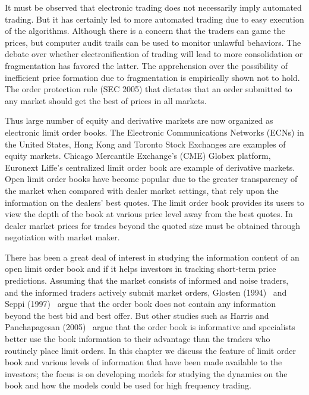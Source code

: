 It must be observed that electronic trading does not necessarily imply automated trading. But it has certainly led to more automated trading due to easy execution of the algorithms. Although there is a concern that the traders can game the prices, but computer audit trails can be used to monitor unlawful behaviors. The debate over whether electronification of trading will lead to more consolidation or fragmentation has favored the latter. The apprehension over the possibility of inefficient price formation due to fragmentation is empirically shown not to hold. The order protection rule (SEC 2005) that dictates that an order submitted to any market should get the best of prices in all markets. 


Thus large number of equity and derivative markets are now organized as electronic limit order books. The Electronic Communications Networks (ECNs) in the United States, Hong Kong and Toronto Stock Exchanges are examples of equity markets. Chicago Mercantile Exchange's (CME) Globex platform, Euronext Liffe's centralized limit order book are example of derivative markets. Open limit order books have become popular due to the greater transparency of the market when compared with dealer market settings, that rely upon the information on the dealers' best quotes. The limit order book provides its users to view the depth of the book at various price level away from the best quotes. In dealer market prices for trades beyond the quoted size must be obtained through negotiation with market maker. 


There has been a great deal of interest in studying the information content of an open limit order book and if it helps investors in tracking short-term price predictions. Assuming that the market consists of informed and noise traders, and the informed traders actively submit market orders, Glosten (1994)~\cite{glosten94} and Seppi (1997)~\cite{seppi97} argue that the order book does not contain any information beyond the best bid and best offer. But other studies such as Harris and Panchapagesan (2005)~\cite{harrispan} argue that the order book is informative and specialists better use the book information to their advantage than the traders who routinely place limit orders. In this chapter we discuss the feature of limit order book and various levels of information that have been made available to the investors; the focus is on developing models for studying the dynamics on the book and how the models could be used for high frequency trading. 


